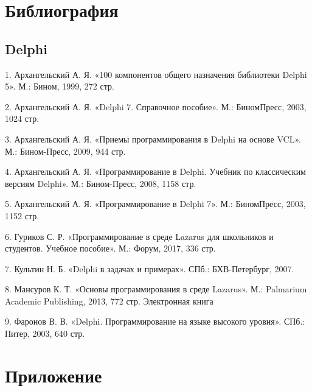 \documentclass[a4paper,14pt]{extarticle}
\begin{document}
\section{Библиография} 

\subsection{Delphi}
1. Архангельский А. Я. «100 компонентов общего назначения библиотеки Delphi 5». М.: Бином, 1999, 272 стр.

2. Архангельский А. Я. «Delphi 7. Справочное пособие». М.: БиномПресс, 2003, 1024 стр.

3. Архангельский А. Я. «Приемы программирования в Delphi на основе VCL». М.: Бином-Пресс, 2009, 944 стр.

4. Архангельский А. Я. «Программирование в Delphi. Учебник по классическим версиям Delphi». М.: Бином-Пресс, 2008, 1158 стр.

5. Архангельский А. Я. «Программирование в Delphi 7». М.: БиномПресс, 2003, 1152 стр.

6. Гуриков С. Р. «Программирование в среде Lazarus для школьников и студентов. Учебное пособие». М.: Форум, 2017, 336 стр.

7. Культин Н. Б. «Delphi в задачах и примерах». СПб.: БХВ-Петербург, 2007.

8. Мансуров К. Т. «Основы программирования в среде Lazarus». М.: Palmarium Academic Publishing, 2013, 772 стр. Электронная книга

9. Фаронов В. В. «Delphi. Программирование на языке высокого уровня». СПб.: Питер, 2003, 640 стр. 

\section{Приложение}
\end{document}
